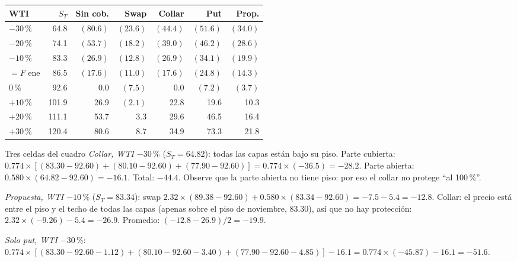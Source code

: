 \begin{center}\small
{}\label{tab:c9}
\begin{tabular}{@{}lrrrrrr@{}}
\toprule
WTI & $S_T$ & Sin cob. & Swap & Collar & Put & Prop.\\
\midrule
$-30\,\%$ & 64.8 & $(80.6)$ & $(23.6)$ & $(44.4)$ & $(51.6)$ & $(34.0)$\\
$-20\,\%$ & 74.1 & $(53.7)$ & $(18.2)$ & $(39.0)$ & $(46.2)$ & $(28.6)$\\
$-10\,\%$ & 83.3 & $(26.9)$ & $(12.8)$ & $(26.9)$ & $(34.1)$ & $(19.9)$\\
$=F$ ene & 86.5 & $(17.6)$ & $(11.0)$ & $(17.6)$ & $(24.8)$ & $(14.3)$\\
$0\,\%$ & 92.6 & 0.0 & $(7.5)$ & 0.0 & $(7.2)$ & $(3.7)$\\
$+10\,\%$ & 101.9 & 26.9 & $(2.1)$ & 22.8 & 19.6 & 10.3\\
$+20\,\%$ & 111.1 & 53.7 & 3.3 & 29.6 & 46.5 & 16.4\\
$+30\,\%$ & 120.4 & 80.6 & 8.7 & 34.9 & 73.3 & 21.8\\
\bottomrule
\end{tabular}
\end{center}

\begin{ejemplo}{Tres celdas del cuadro}
\emph{Collar, WTI $-30\,\%$} ($S_T=64.82$): todas las capas están bajo su piso. Parte cubierta: $0.774\times[(83.30-92.60)+(80.10-92.60)+(77.90-92.60)]=0.774\times(-36.5)=-28.2$. Parte abierta: $0.580\times(64.82-92.60)=-16.1$. Total: $-44.4$. Observe que la parte abierta no tiene piso: por eso el collar no protege \enquote{al 100\,\%}.

\emph{Propuesta, WTI $-10\,\%$} ($S_T=83.34$): swap $2.32\times(89.38-92.60)+0.580\times(83.34-92.60)=-7.5-5.4=-12.8$. Collar: el precio está entre el piso y el techo de todas las capas (apenas sobre el piso de noviembre, 83.30), así que no hay protección: $2.32\times(-9.26)-5.4=-26.9$. Promedio: $(-12.8-26.9)/2=-19.9$.

\emph{Solo put, WTI $-30\,\%$}: $0.774\times[(83.30-92.60-1.12)+(80.10-92.60-3.40)+(77.90-92.60-4.85)]-16.1=0.774\times(-45.87)-16.1=-51.6$.
\end{ejemplo}



